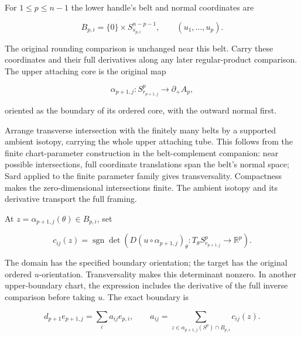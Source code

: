 \label{courseIII:integral-handle-chains-and-signed-incidences:section-3}\label{courseIII:handle-chains:3}

For \(1\leq p\leq n-1\) the lower handle's belt and normal coordinates are

\begin{equation}
B_{p,i}=\{0\}\times S^{n-p-1}_{s_{p,i}},
 \qquad (u_1,\ldots,u_p).
 \label{courseIII:integral-handle-chains-and-signed-incidences:eq:3.1}
\end{equation}

The original rounding comparison is unchanged near this belt. Carry these coordinates and their full derivatives along any later regular-product comparison. The upper attaching core is the original map

\begin{equation}
\alpha_{p+1,j}:S^p_{r_{p+1,j}}\longrightarrow\partial_+A_p,
 \label{courseIII:integral-handle-chains-and-signed-incidences:eq:3.2}
\end{equation}

oriented as the boundary of its ordered core, with the outward normal first.

Arrange transverse intersection with the finitely many belts by a supported ambient isotopy, carrying the whole upper attaching tube. This follows from the finite chart-parameter construction in the belt-complement companion: near possible intersections, full coordinate translations span the belt's normal space; Sard applied to the finite parameter family gives transversality. Compactness makes the zero-dimensional intersections finite. The ambient isotopy and its derivative transport the full framing.

At \(z=\alpha_{p+1,j}(\theta)\in B_{p,i}\), set

\begin{equation}
c_{ij}(z)=
 \operatorname{sgn}\det\left(
 D(u\circ\alpha_{p+1,j})_\theta:
 T_\theta S^p_{r_{p+1,j}}\longrightarrow\mathbb R^p\right).
 \label{courseIII:integral-handle-chains-and-signed-incidences:eq:3.3}
\end{equation}

The domain has the specified boundary orientation; the target has the original ordered \(u\)-orientation. Transversality makes this determinant nonzero. In another upper-boundary chart, the expression includes the derivative of the full inverse comparison before taking \(u\). The exact boundary is

\begin{equation}
d_{p+1}e_{p+1,j}=\sum_i a_{ij}e_{p,i},
 \qquad
 a_{ij}=\sum_{z\in\alpha_{p+1,j}(S^p)\cap B_{p,i}}c_{ij}(z).
 \label{courseIII:integral-handle-chains-and-signed-incidences:eq:3.4}
\end{equation}

